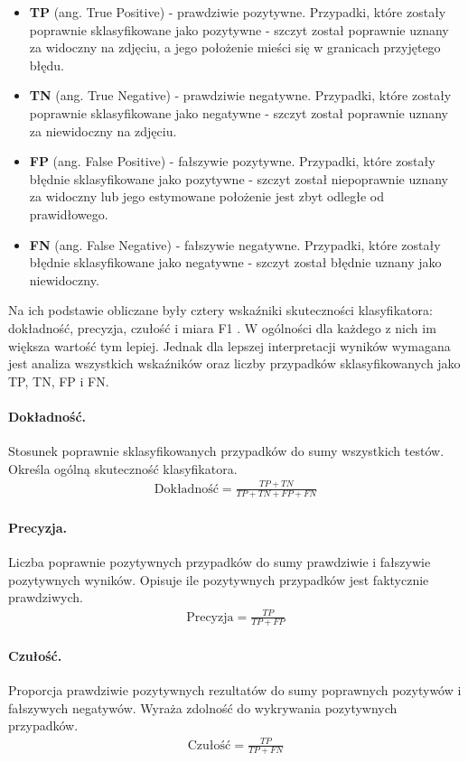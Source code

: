 \begin{itemize}
    \item \textbf{TP} (ang. True Positive) - prawdziwie pozytywne. Przypadki, które zostały poprawnie sklasyfikowane jako pozytywne - szczyt został poprawnie uznany za widoczny na zdjęciu, a jego położenie mieści się w granicach przyjętego błędu.
    \item \textbf{TN} (ang. True Negative) - prawdziwie negatywne. Przypadki, które zostały poprawnie sklasyfikowane jako negatywne - szczyt został poprawnie uznany za niewidoczny na zdjęciu.
    \item \textbf{FP} (ang. False Positive) - fałszywie pozytywne. Przypadki, które zostały błędnie sklasyfikowane jako pozytywne - szczyt został niepoprawnie uznany za widoczny lub jego estymowane położenie jest zbyt odległe od prawidłowego. 
    \item \textbf{FN} (ang. False Negative) - fałszywie negatywne. Przypadki, które zostały błędnie sklasyfikowane jako negatywne - szczyt został błędnie uznany jako niewidoczny.
\end{itemize}

Na ich podstawie obliczane były cztery wskaźniki skuteczności klasyfikatora: dokładność, precyzja, czułość i miara F1 \cite{metrics}. W ogólności dla każdego z nich im większa wartość tym lepiej. Jednak dla lepszej interpretacji wyników wymagana jest analiza wszystkich wskaźników oraz liczby przypadków sklasyfikowanych jako TP, TN, FP i FN.

\paragraph{Dokładność.} Stosunek poprawnie sklasyfikowanych przypadków do sumy wszystkich testów. Określa ogólną skuteczność klasyfikatora.
\begin{align*}
\textrm{Dokładność} =  \frac{TP + TN}{TP+TN+FP+FN}
\end{align*} 


\paragraph{Precyzja.} Liczba poprawnie pozytywnych przypadków do sumy prawdziwie i fałszywie pozytywnych wyników. Opisuje ile pozytywnych przypadków jest faktycznie prawdziwych. 
\begin{align*}
\textrm{Precyzja} = \frac{TP}{TP+FP}
\end{align*} 


\paragraph{Czułość.} Proporcja prawdziwie pozytywnych rezultatów do sumy poprawnych pozytywów i fałszywych negatywów. Wyraża zdolność do wykrywania pozytywnych przypadków.
\begin{align*}
\textrm{Czułość} =  \frac{TP}{TP+FN}
\end{align*} 

